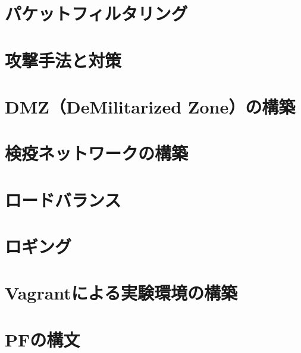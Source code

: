 \documentclass[fleqn]{jsarticle}
\begin{document}
\section{パケットフィルタリング}

\section{攻撃手法と対策}

\section{DMZ（DeMilitarized Zone）の構築}

\section{検疫ネットワークの構築}

\section{ロードバランス}

\section{ロギング}

\appendix

\section{Vagrantによる実験環境の構築}

\section{PFの構文}


\end{document}
